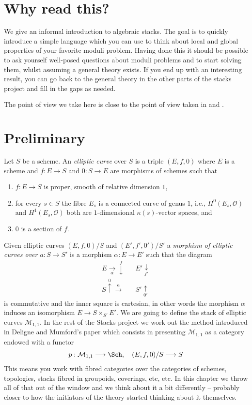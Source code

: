 \section{Why read this?}
\label{stacks-introduction-section-introduction}
We give an informal introduction to algebraic stacks. The goal is to
quickly introduce a simple language which you can use to think
about local and global properties of your favorite moduli problem.
Having done this it should be possible to ask yourself well-posed questions
about moduli problems and to start solving them, whilst assuming a general
theory exists. If you end up with an interesting result,
you can go back to the general theory in the other parts of the stacks
project and fill in the gaps as needed.

\medskip\noindent
The point of view we take here is close to the point of view taken in
\cite{KatzMazur} and \cite{mumford_picard}.

\section{Preliminary}
\label{stacks-introduction-section-preliminary}
Let $S$ be a scheme. An {\it elliptic curve} over $S$ is a triple
$(E, f, 0)$ where $E$ is a scheme and $f : E \to S$ and $0 : S \to E$
are morphisms of schemes such that
\begin{enumerate}
\item $f : E \to S$ is proper, smooth of relative dimension $1$,
\item for every $s \in S$ the fibre $E_s$ is a connected curve
of genus $1$, i.e., $H^0(E_s, \mathcal{O})$ and $H^1(E_s, \mathcal{O})$
both are $1$-dimensional $\kappa(s)$-vector spaces, and
\item $0$ is a section of $f$.
\end{enumerate}
Given elliptic curves $(E, f, 0)/S$ and $(E', f', 0')/S'$ a
{\it morphism of elliptic curves over $a : S \to S'$}
is a morphism $\alpha : E \to E'$ such that the diagram
$$
\begin{array}{ccc}E \underset{\alpha}{\longrightarrow}\overset{f}{\downarrow} &  & E' \underset{f'}{\downarrow} \\ S \overset{0}{\uparrow}\overset{a}{\longrightarrow} &  & S' \underset{0'}{\uparrow}\end{array}
$$
is commutative and the inner square is cartesian, in other words the
morphism $\alpha$ induces an isomorphism $E \to S \times_{S'} E'$.
We are going to define the stack of elliptic curves $\mathcal{M}_{1, 1}$.
In the rest of the Stacks project we work out the method introduced in
Deligne and Mumford's paper \cite{DM} which consists in presenting
$\mathcal{M}_{1, 1}$ as a category endowed with a functor
$$
p : \mathcal{M}_{1, 1} \longrightarrow \Sch, \quad
(E, f, 0)/S \longmapsto S
$$
This means you work with fibred categories over the categories of schemes,
topologies, stacks fibred in groupoids, coverings, etc, etc.
In this chapter we throw all of that out of the window and
we think about it a bit differently -- probably closer to how the initiators
of the theory started thinking about it themselves.

